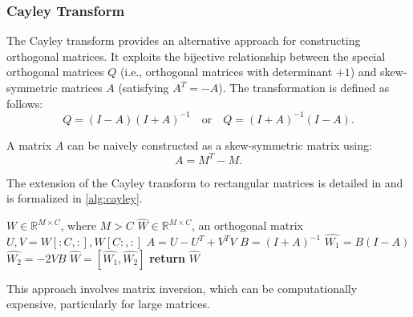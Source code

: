     \subsubsection{Cayley Transform}
        
        The Cayley transform \cite{Cayley_1846} provides an alternative approach for constructing orthogonal matrices. It exploits the bijective relationship between the special orthogonal matrices $Q$ (i.e., orthogonal matrices with determinant $+1$) and skew-symmetric matrices $A$ (satisfying $A^T = -A$). The transformation is defined as follows:
        \begin{equation}\label{eq:cayley}
        Q = (I - A)(I + A)^{-1} \quad \text{or} \quad Q = (I + A)^{-1}(I - A).
        \end{equation}
        
        A matrix $A$ can be naively constructed as a skew-symmetric matrix using:
        \begin{equation}
            A = M^T - M.
        \end{equation}
        
        The extension of the Cayley transform to rectangular matrices is detailed in \cite{pauli2023lipschitz} and is formalized in  \cref{alg:cayley}.
        
        \begin{algorithm} 
        \begin{algorithmic}[1] 
        \Require $W\in \mathbb{R}^{M\times C}$, where $M>C$
        \Ensure $\hat{W}\in \mathbb{R}^{M\times C}$, an orthogonal matrix
        \State $U,V = W[:C,:],W[C:,:]$ 
        \State $A = U - U^T + V^T V$ 
        \State $B = (I + A)^{-1}$
        \State $\hat{W_1} = B (I - A)$  
        \State $\hat{W_2} = -2 V B$ 
        \State $\hat{W} =  [\hat{W_1}, \hat{W_2}]$  
        \State \textbf{return} $\hat{W}$
        \EndProcedure
        \end{algorithmic}
        \caption{Cayley Transform Algorithm}   \label{alg:cayley}   
        \end{algorithm}
        
        This approach involves matrix inversion, which can be computationally expensive, particularly for large matrices.
        
